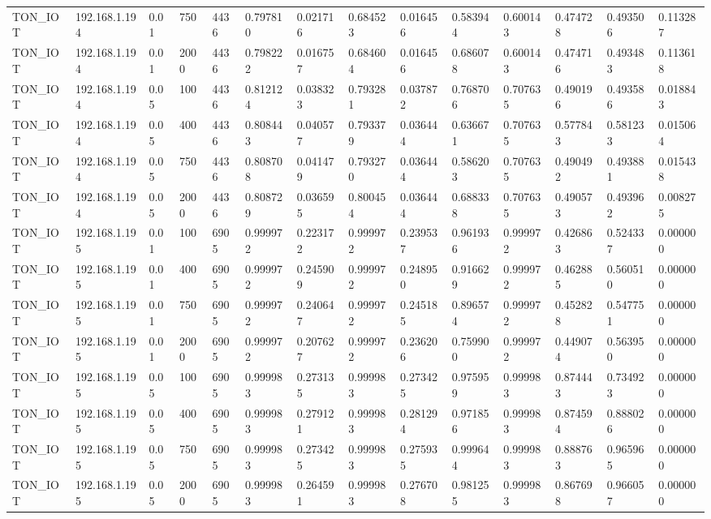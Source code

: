 \begin{tabular}{llllllllllllll}
TON\_IOT & 192.168.1.194 & 0.01 & 750 & 4436 & 0.797810 & 0.021716 & 0.684523 & 0.016456 & 0.583944 & 0.600143 & 0.474728 & 0.493506 & 0.113287 \\
TON\_IOT & 192.168.1.194 & 0.01 & 2000 & 4436 & 0.798222 & 0.016757 & 0.684604 & 0.016456 & 0.686078 & 0.600143 & 0.474716 & 0.493483 & 0.113618 \\
TON\_IOT & 192.168.1.194 & 0.05 & 100 & 4436 & 0.812124 & 0.038323 & 0.793281 & 0.037872 & 0.768706 & 0.707635 & 0.490196 & 0.493586 & 0.018843 \\
TON\_IOT & 192.168.1.194 & 0.05 & 400 & 4436 & 0.808443 & 0.040577 & 0.793379 & 0.036444 & 0.636671 & 0.707635 & 0.577843 & 0.581233 & 0.015064 \\
TON\_IOT & 192.168.1.194 & 0.05 & 750 & 4436 & 0.808708 & 0.041479 & 0.793270 & 0.036444 & 0.586203 & 0.707635 & 0.490492 & 0.493881 & 0.015438 \\
TON\_IOT & 192.168.1.194 & 0.05 & 2000 & 4436 & 0.808729 & 0.036595 & 0.800454 & 0.036444 & 0.688338 & 0.707635 & 0.490573 & 0.493962 & 0.008275 \\
TON\_IOT & 192.168.1.195 & 0.01 & 100 & 6905 & 0.999972 & 0.223172 & 0.999972 & 0.239537 & 0.961936 & 0.999972 & 0.426863 & 0.524337 & 0.000000 \\
TON\_IOT & 192.168.1.195 & 0.01 & 400 & 6905 & 0.999972 & 0.245909 & 0.999972 & 0.248950 & 0.916629 & 0.999972 & 0.462885 & 0.560510 & 0.000000 \\
TON\_IOT & 192.168.1.195 & 0.01 & 750 & 6905 & 0.999972 & 0.240647 & 0.999972 & 0.245185 & 0.896574 & 0.999972 & 0.452828 & 0.547751 & 0.000000 \\
TON\_IOT & 192.168.1.195 & 0.01 & 2000 & 6905 & 0.999972 & 0.207627 & 0.999972 & 0.236206 & 0.759900 & 0.999972 & 0.449074 & 0.563950 & 0.000000 \\
TON\_IOT & 192.168.1.195 & 0.05 & 100 & 6905 & 0.999983 & 0.273135 & 0.999983 & 0.273425 & 0.975959 & 0.999983 & 0.874443 & 0.734923 & 0.000000 \\
TON\_IOT & 192.168.1.195 & 0.05 & 400 & 6905 & 0.999983 & 0.279121 & 0.999983 & 0.281294 & 0.971856 & 0.999983 & 0.874594 & 0.888026 & 0.000000 \\
TON\_IOT & 192.168.1.195 & 0.05 & 750 & 6905 & 0.999983 & 0.273425 & 0.999983 & 0.275935 & 0.999644 & 0.999983 & 0.888763 & 0.965965 & 0.000000 \\
TON\_IOT & 192.168.1.195 & 0.05 & 2000 & 6905 & 0.999983 & 0.264591 & 0.999983 & 0.276708 & 0.981255 & 0.999983 & 0.867698 & 0.966057 & 0.000000 \\

\end{tabular}
